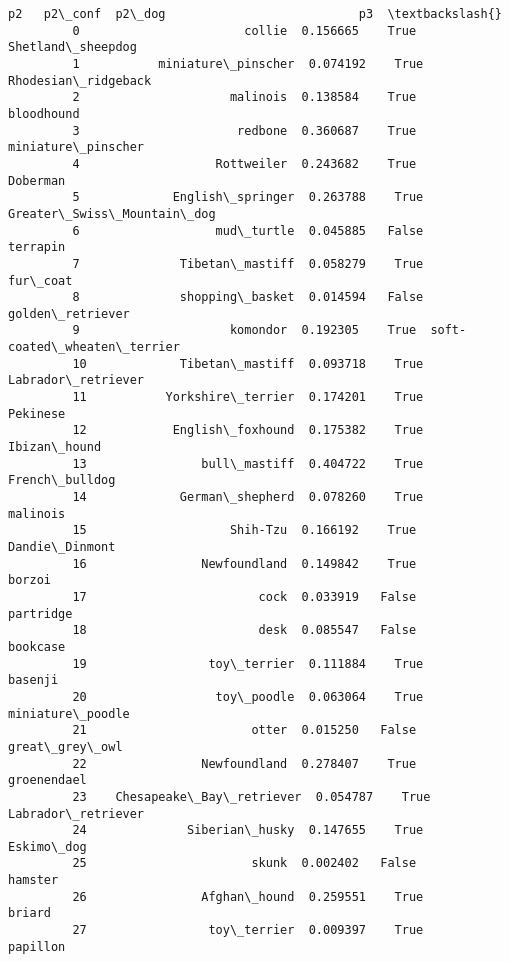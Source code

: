 \documentclass[11pt]{article}
\begin{document}
\begin{Verbatim}[commandchars=\\\{\}]
                                     p2   p2\_conf  p2\_dog                           p3  \textbackslash{}
         0                       collie  0.156665    True            Shetland\_sheepdog   
         1           miniature\_pinscher  0.074192    True          Rhodesian\_ridgeback   
         2                     malinois  0.138584    True                   bloodhound   
         3                      redbone  0.360687    True           miniature\_pinscher   
         4                   Rottweiler  0.243682    True                     Doberman   
         5             English\_springer  0.263788    True   Greater\_Swiss\_Mountain\_dog   
         6                   mud\_turtle  0.045885   False                     terrapin   
         7              Tibetan\_mastiff  0.058279    True                     fur\_coat   
         8              shopping\_basket  0.014594   False             golden\_retriever   
         9                     komondor  0.192305    True  soft-coated\_wheaten\_terrier   
         10             Tibetan\_mastiff  0.093718    True           Labrador\_retriever   
         11           Yorkshire\_terrier  0.174201    True                     Pekinese   
         12            English\_foxhound  0.175382    True                 Ibizan\_hound   
         13                bull\_mastiff  0.404722    True               French\_bulldog   
         14             German\_shepherd  0.078260    True                     malinois   
         15                    Shih-Tzu  0.166192    True               Dandie\_Dinmont   
         16                Newfoundland  0.149842    True                       borzoi   
         17                        cock  0.033919   False                    partridge   
         18                        desk  0.085547   False                     bookcase   
         19                 toy\_terrier  0.111884    True                      basenji   
         20                  toy\_poodle  0.063064    True             miniature\_poodle   
         21                       otter  0.015250   False               great\_grey\_owl   
         22                Newfoundland  0.278407    True                  groenendael   
         23    Chesapeake\_Bay\_retriever  0.054787    True           Labrador\_retriever   
         24              Siberian\_husky  0.147655    True                   Eskimo\_dog   
         25                       skunk  0.002402   False                      hamster   
         26                Afghan\_hound  0.259551    True                       briard   
         27                 toy\_terrier  0.009397    True                     papillon   

\end{Verbatim}
\end{document}
